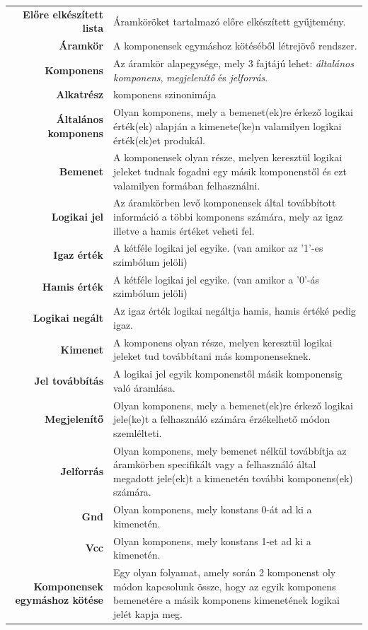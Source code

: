 \begin{longtable}{r p{10.95cm}}
\textbf{Előre elkészített lista} & Áramköröket tartalmazó előre elkészített gyűjtemény. \\
\textbf{Áramkör} & A komponensek egymáshoz kötéséből létrejövő rendszer. \\
\textbf{Komponens} & Az áramkör alapegysége, mely 3 fajtájú lehet: \emph{általános komponens}, \emph{megjelenítő} és \emph{jelforrás}. \\
\textbf{Alkatrész} & komponens szinonimája\\
\textbf{Általános komponens} & Olyan komponens, mely a bemenet(ek)re érkező logikai érték(ek) alapján a kimenete(ke)n valamilyen logikai érték(ek)et produkál.\\
\textbf{Bemenet} & A komponensek olyan része, melyen keresztül logikai jeleket tudnak fogadni egy másik komponenstől és ezt valamilyen formában felhasználni. \\
\textbf{Logikai jel} & Az áramkörben levő komponensek által továbbított információ a többi komponens számára, mely az igaz illetve a hamis értéket veheti fel.\\
\textbf{Igaz érték} & A kétféle logikai jel egyike. (van amikor az '1'-es szimbólum jelöli)\\
\textbf{Hamis érték} & A kétféle logikai jel egyike. (van amikor a '0'-ás szimbólum jelöli)\\
\textbf{Logikai negált} & Az igaz érték logikai negáltja hamis, hamis értéké pedig igaz.\\
\textbf{Kimenet} & A komponens olyan része, melyen keresztül logikai jeleket tud továbbítani más komponenseknek.\\
\textbf{Jel továbbítás} & A logikai jel egyik komponenstől másik komponensig való áramlása.\\
\textbf{Megjelenítő} & Olyan komponens, mely a bemenet(ek)re érkező logikai jele(ke)t a felhasználó számára érzékelhető módon szemlélteti.\\
\textbf{Jelforrás} & Olyan komponens, mely bemenet nélkül továbbítja az áramkörben specifikált vagy a felhasználó által megadott jele(ek)t a kimenetén további komponens(ek) számára. \\
\textbf{Gnd} & Olyan komponens, mely konstans 0-át ad ki a kimenetén. \\
\textbf{Vcc} & Olyan komponens, mely konstans 1-et ad ki a kimenetén. \\
\textbf{Komponensek egymáshoz kötése} & Egy olyan folyamat, amely során 2 komponenst oly módon kapcso\-lunk össze, hogy az egyik komponens bemenetére a másik komponens kimenetének logikai jelét kapja meg.\\

\end{longtable}
